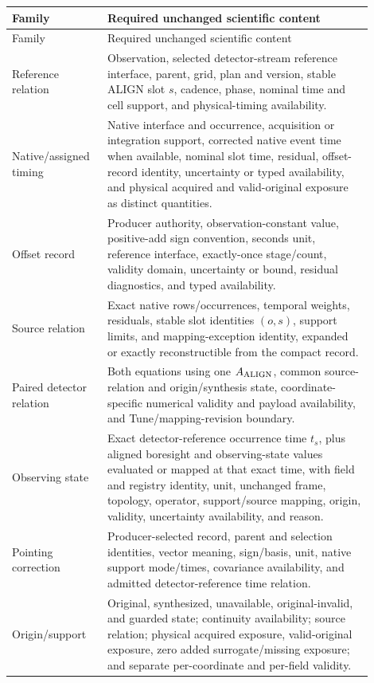 \begin{longtable}{L{0.22\linewidth}L{0.68\linewidth}}
\toprule
Family & Required unchanged scientific content\\
\midrule
\endfirsthead
\toprule
Family & Required unchanged scientific content\\
\midrule
\endhead
Reference relation & Observation, selected detector-stream reference
interface, parent, grid, plan and version, stable ALIGN slot \(s\), cadence, phase,
nominal time and cell support, and physical-timing availability.\\
Native/assigned timing & Native interface and occurrence, acquisition or
integration support, corrected native event time when available, nominal slot
time, residual, offset-record identity, uncertainty or typed availability, and
physical acquired and valid-original exposure as distinct quantities.\\
Offset record & Producer authority, observation-constant value, positive-add
sign convention, seconds unit, reference interface, exactly-once stage/count,
validity domain, uncertainty or bound, residual diagnostics, and typed
availability.\\
Source relation & Exact native rows/occurrences, temporal weights, residuals,
stable slot identities \((o,s)\), support limits, and mapping-exception identity, expanded or
exactly reconstructible from the compact record.\\
Paired detector relation & Both equations using one \(A_{\rm ALIGN}\), common
source-relation and origin/synthesis state, coordinate-specific numerical
validity and payload availability, and Tune/mapping-revision boundary.\\
Observing state & Exact detector-reference occurrence time \(t_s\), plus
aligned boresight and observing-state values evaluated or mapped at that exact
time, with
field and registry identity, unit, unchanged frame, topology, operator,
support/source mapping, origin, validity, uncertainty availability, and
reason.\\
Pointing correction & Producer-selected record, parent and selection
identities, vector meaning, sign/basis, unit, native support mode/times,
covariance availability, and admitted detector-reference time relation.\\
Origin/support & Original, synthesized, unavailable, original-invalid, and
guarded state; continuity availability; source relation; physical acquired
exposure, valid-original exposure, zero added surrogate/missing exposure;
and separate per-coordinate and per-field validity.\\

\end{longtable}
